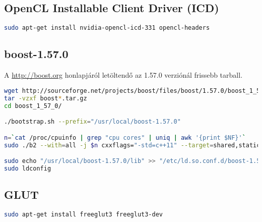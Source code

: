 \subsection*{OpenCL Installable Client Driver (ICD)}

\begin{lstlisting}[language=bash]
sudo apt-get install nvidia-opencl-icd-331 opencl-headers
\end{lstlisting}

\subsection*{boost-1.57.0}
	A \url{http://boost.org} honlapjáról letöltendő az 1.57.0 verziónál frissebb tarball.

\begin{lstlisting}[language=bash]
wget http://sourceforge.net/projects/boost/files/boost/1.57.0/boost_1_57_0.tar.gz
tar -vzxf boost*.tar.gz
cd boost_1_57_0/

./bootstrap.sh --prefix="/usr/local/boost-1.57.0"

n=`cat /proc/cpuinfo | grep "cpu cores" | uniq | awk '{print $NF}'`
sudo ./b2 --with=all -j $n cxxflags="-std=c++11" --target=shared,static install

sudo echo "/usr/local/boost-1.57.0/lib" >> "/etc/ld.so.conf.d/boost-1.57.0.conf"
sudo ldconfig
\end{lstlisting}

\subsection*{GLUT}

\begin{lstlisting}[language=bash]
sudo apt-get install freeglut3 freeglut3-dev
\end{lstlisting}



